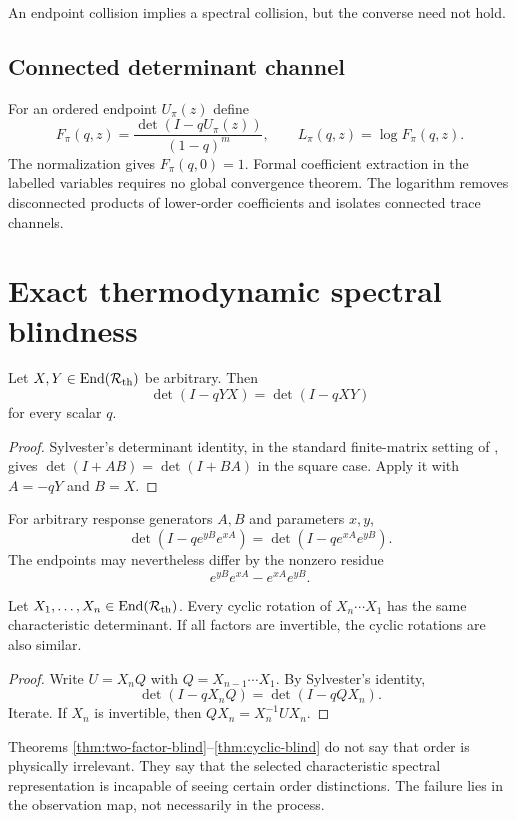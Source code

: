An endpoint collision implies a spectral collision, but the converse need not hold.

\subsection{Connected determinant channel}

For an ordered endpoint $U_\pi(z)$ define
\[
 F_\pi(q,z)=\frac{\det(I-qU_\pi(z))}{(1-q)^m},
 \qquad
 L_\pi(q,z)=\log F_\pi(q,z).
\]
The normalization gives $F_\pi(q,0)=1$. Formal coefficient extraction in the labelled variables requires no global convergence theorem. The logarithm removes disconnected products of lower-order coefficients and isolates connected trace channels.

\section{Exact thermodynamic spectral blindness}

\begin{theorem}\label{thm:two-factor-blind}
Let $X,Y\in\operatorname{End}(\mathcal R_{\mathrm{th}})$ be arbitrary. Then
\[
 \det(I-qYX)=\det(I-qXY)
\]
for every scalar $q$.
\end{theorem}

\begin{proof}
Sylvester's determinant identity, in the standard finite-matrix setting of \cite{hornjohnson2013}, gives $\det(I+AB)=\det(I+BA)$ in the square case. Apply it with $A=-qY$ and $B=X$.
\end{proof}

\begin{corollary}
For arbitrary response generators $A,B$ and parameters $x,y$,
\[
 \det(I-qe^{yB}e^{xA})
 =\det(I-qe^{xA}e^{yB}).
\]
The endpoints may nevertheless differ by the nonzero residue
\[
 e^{yB}e^{xA}-e^{xA}e^{yB}.
\]
\end{corollary}

\begin{theorem}\label{thm:cyclic-blind}
Let $X_1,\ldots,X_n\in\operatorname{End}(\mathcal R_{\mathrm{th}})$. Every cyclic rotation of $X_n\cdots X_1$ has the same characteristic determinant. If all factors are invertible, the cyclic rotations are also similar.
\end{theorem}

\begin{proof}
Write $U=X_nQ$ with $Q=X_{n-1}\cdots X_1$. By Sylvester's identity,
\[
 \det(I-qX_nQ)=\det(I-qQX_n).
\]
Iterate. If $X_n$ is invertible, then $QX_n=X_n^{-1}UX_n$.
\end{proof}

\begin{remark}
Theorems \ref{thm:two-factor-blind}--\ref{thm:cyclic-blind} do not say that order is physically irrelevant. They say that the selected characteristic spectral representation is incapable of seeing certain order distinctions. The failure lies in the observation map, not necessarily in the process.
\end{remark}
